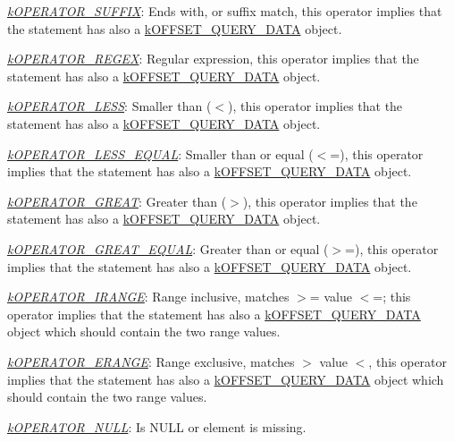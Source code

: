 {\begin{DoxyItemize}
\begin{DoxyItemize}
\item {\itshape \hyperlink{}{k\-O\-P\-E\-R\-A\-T\-O\-R\-\_\-\-S\-U\-F\-F\-I\-X}}\-: Ends with, or suffix match, this operator implies that the statement has also a \hyperlink{}{k\-O\-F\-F\-S\-E\-T\-\_\-\-Q\-U\-E\-R\-Y\-\_\-\-D\-A\-T\-A} object. 
\item {\itshape \hyperlink{}{k\-O\-P\-E\-R\-A\-T\-O\-R\-\_\-\-R\-E\-G\-E\-X}}\-: Regular expression, this operator implies that the statement has also a \hyperlink{}{k\-O\-F\-F\-S\-E\-T\-\_\-\-Q\-U\-E\-R\-Y\-\_\-\-D\-A\-T\-A} object. 
\item {\itshape \hyperlink{}{k\-O\-P\-E\-R\-A\-T\-O\-R\-\_\-\-L\-E\-S\-S}}\-: Smaller than ({\ttfamily $<$}), this operator implies that the statement has also a \hyperlink{}{k\-O\-F\-F\-S\-E\-T\-\_\-\-Q\-U\-E\-R\-Y\-\_\-\-D\-A\-T\-A} object. 
\item {\itshape \hyperlink{}{k\-O\-P\-E\-R\-A\-T\-O\-R\-\_\-\-L\-E\-S\-S\-\_\-\-E\-Q\-U\-A\-L}}\-: Smaller than or equal ({\ttfamily $<$=}), this operator implies that the statement has also a \hyperlink{}{k\-O\-F\-F\-S\-E\-T\-\_\-\-Q\-U\-E\-R\-Y\-\_\-\-D\-A\-T\-A} object. 
\item {\itshape \hyperlink{}{k\-O\-P\-E\-R\-A\-T\-O\-R\-\_\-\-G\-R\-E\-A\-T}}\-: Greater than ({\ttfamily $>$}), this operator implies that the statement has also a \hyperlink{}{k\-O\-F\-F\-S\-E\-T\-\_\-\-Q\-U\-E\-R\-Y\-\_\-\-D\-A\-T\-A} object. 
\item {\itshape \hyperlink{}{k\-O\-P\-E\-R\-A\-T\-O\-R\-\_\-\-G\-R\-E\-A\-T\-\_\-\-E\-Q\-U\-A\-L}}\-: Greater than or equal ({\ttfamily $>$=}), this operator implies that the statement has also a \hyperlink{}{k\-O\-F\-F\-S\-E\-T\-\_\-\-Q\-U\-E\-R\-Y\-\_\-\-D\-A\-T\-A} object. 
\item {\itshape \hyperlink{}{k\-O\-P\-E\-R\-A\-T\-O\-R\-\_\-\-I\-R\-A\-N\-G\-E}}\-: Range inclusive, matches {\ttfamily $>$= value $<$=}; this operator implies that the statement has also a \hyperlink{}{k\-O\-F\-F\-S\-E\-T\-\_\-\-Q\-U\-E\-R\-Y\-\_\-\-D\-A\-T\-A} object which should contain the two range values. 
\item {\itshape \hyperlink{}{k\-O\-P\-E\-R\-A\-T\-O\-R\-\_\-\-E\-R\-A\-N\-G\-E}}\-: Range exclusive, matches {\ttfamily $>$ value $<$}, this operator implies that the statement has also a \hyperlink{}{k\-O\-F\-F\-S\-E\-T\-\_\-\-Q\-U\-E\-R\-Y\-\_\-\-D\-A\-T\-A} object which should contain the two range values. 
\item {\itshape \hyperlink{}{k\-O\-P\-E\-R\-A\-T\-O\-R\-\_\-\-N\-U\-L\-L}}\-: Is {\ttfamily N\-U\-L\-L} or element is missing. 

\end{DoxyItemize}
\end{DoxyItemize}}
